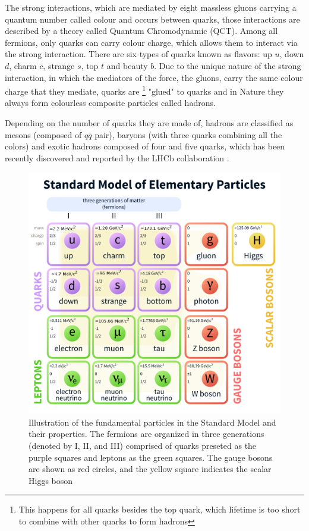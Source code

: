 The strong interactions, which are mediated by eight massless gluons carrying a quantum number called colour and occurs between quarks, those interactions are described by a theory called Quantum Chromodynamic (QCT). Among all fermions, only quarks can carry colour charge, which allows them to interact via the strong interaction. There are six types of quarks known as flavors: up $u$,  down $d$, charm $c$, strange $s$, top $t$ and beauty $b$.  Due to the unique nature of the strong interaction, in which the mediators of the force, the gluons, carry the same colour charge that they mediate, quarks are \footnote{This happens for all quarks besides the top quark, which lifetime is too short to combine with other quarks to form hadrons} "glued" to quarks and in Nature they always form colourless composite particles called hadrons. 

Depending on the number of quarks they are made of, hadrons are classified as mesons (composed of $q\bar{q}$ pair), baryons (with three quarks combining all the colors) and exotic hadrons composed of four and five quarks, which has been recently discovered and reported by the LHCb collaboration \cite{pentaquarks}.  

\begin{figure}
\centering
\includegraphics[scale=1.0]{figures/SM.png}
\caption{Illustration of the fundamental particles in the Standard Model and their properties. The fermions are organized in three generations (denoted by I, II, and III) comprised of quarks preseted as the purple squares and leptons as the green squares. The  gauge bosons are shown as red circles, and the yellow square indicates the scalar Higgs boson 
\label{fig:SM}}
\end{figure}

